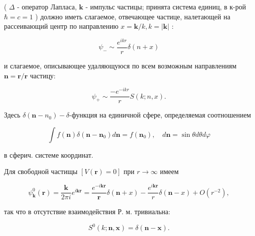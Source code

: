 \documentclass[10pt]{article}
\begin{document}
( $\Delta$ - оператор Лапласа, $\boldsymbol{k}$ - импульс частицы; принята система единиц, в к-рой $\hbar=c=1$ ) должно иметь слагаемое, отвечающее частице, налетающей на рассеивающий центр по направлению $x=\boldsymbol{k} / k, k=|\boldsymbol{k}|$ :



\[

\psi_{-} \sim \frac{e^{i k r}}{r} \delta(n+x)

\]



и слагаемое, описывающее удаляющуюся по всем возможным направлениям $\boldsymbol{n}=\boldsymbol{r} / \boldsymbol{r}$ частицу:



\[

\psi_{+} \sim \frac{-e^{-i k r}}{r} S(k ; n, x) .

\]



Здесь $\delta\left(\boldsymbol{n}-n_{0}\right)-\delta$-функция на единичной сфере, определяемая соотношением



\[

\int f(\boldsymbol{n}) \delta\left(\boldsymbol{n}-\boldsymbol{n}_{0}\right) d \boldsymbol{n}=f\left(\boldsymbol{n}_{0}\right), \quad d \boldsymbol{n}=\sin \theta d \theta d \varphi

\]



в сферич. системе координат.



Для свободной частищы $[V(\boldsymbol{r})=0]$ при $r \rightarrow \infty$ имеем



\[

\psi_{\boldsymbol{k}}^{0}(\boldsymbol{r})=\frac{\boldsymbol{k}}{2 \pi i} e^{i \boldsymbol{k} \boldsymbol{r}}=\frac{e^{-i \boldsymbol{k} \boldsymbol{r}}}{\boldsymbol{r}} \delta(\boldsymbol{n}+x)-\frac{e^{i \boldsymbol{k} \boldsymbol{r}}}{r} \delta(\boldsymbol{n}-x)+O\left(r^{-2}\right),

\]



так что в отсутствие взаимодействия Р. м. тривиальна:



\[

S^{0}(k ; \boldsymbol{n}, \boldsymbol{x})=\delta(\boldsymbol{n}-\boldsymbol{x}) .

\]
\end{document}
